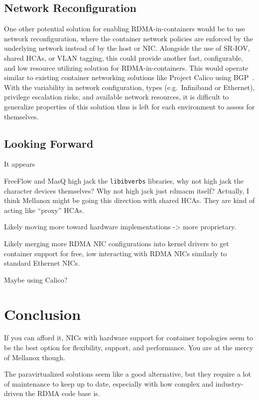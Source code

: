 \documentclass[12pt,titlepage]{article}
\begin{document}
\subsection{Network Reconfiguration}
One other potential solution for enabling RDMA-in-containers would be to use network reconfiguration, where the container network policies are enforced by the underlying network instead of by the host or NIC.
Alongside the use of SR-IOV, shared HCAs, or VLAN tagging, this could provide another fast, configurable, and low resource utilizing solution for RDMA-in-containers.
This would operate similar to existing container networking solutions like Project Calico using BGP~\cite{caliconetwork}.
With the variability in network configuration, types (e.g.\ Infiniband or Ethernet), privilege escalation risks, and available network resources, it is difficult to generalize properties of this solution thus is left for each environment to assess for themselves.

\subsection{Looking Forward}
It appears 

FreeFlow and MasQ high jack the \texttt{libibverbs} libraries, why not high jack the character devices themselves?
Why not high jack just rdmacm itself?
Actually, I think Mellanox might be going this direction with shared HCAs.
They are kind of acting like ``proxy'' HCAs.

Likely moving more toward hardware implementations -> more proprietary.

Likely merging more RDMA NIC configurations into kernel drivers to get container support for free, iow interacting with RDMA NICs similarly to standard Ethernet NICs.

Maybe using Calico?

\section{Conclusion}
If you can afford it, NICs with hardware support for container topologies seem to be the best option for flexibility, support, and performance.
You are at the mercy of Mellanox though.

The paravirtualized solutions seem like a good alternative, but they require a lot of maintenance to keep up to date, especially with how complex and industry-driven the RDMA code base is.
\end{document}
